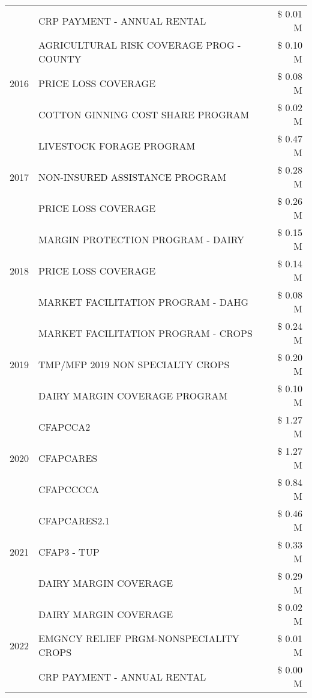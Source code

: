 \begin{tabular}{llr}
 & CRP PAYMENT - ANNUAL RENTAL & \$ 0.01 M \\
\cline{1-3}
\multirow[t]{3}{*}{2016} & AGRICULTURAL RISK COVERAGE PROG - COUNTY & \$ 0.10 M \\
 & PRICE LOSS COVERAGE & \$ 0.08 M \\
 & COTTON GINNING COST SHARE PROGRAM & \$ 0.02 M \\
\cline{1-3}
\multirow[t]{3}{*}{2017} & LIVESTOCK FORAGE PROGRAM & \$ 0.47 M \\
 & NON-INSURED ASSISTANCE PROGRAM & \$ 0.28 M \\
 & PRICE LOSS COVERAGE & \$ 0.26 M \\
\cline{1-3}
\multirow[t]{3}{*}{2018} & MARGIN PROTECTION PROGRAM - DAIRY & \$ 0.15 M \\
 & PRICE LOSS COVERAGE & \$ 0.14 M \\
 & MARKET FACILITATION PROGRAM - DAHG & \$ 0.08 M \\
\cline{1-3}
\multirow[t]{3}{*}{2019} & MARKET FACILITATION PROGRAM - CROPS & \$ 0.24 M \\
 & TMP/MFP 2019 NON SPECIALTY CROPS & \$ 0.20 M \\
 & DAIRY MARGIN COVERAGE PROGRAM & \$ 0.10 M \\
\cline{1-3}
\multirow[t]{3}{*}{2020} & CFAPCCA2 & \$ 1.27 M \\
 & CFAPCARES & \$ 1.27 M \\
 & CFAPCCCCA & \$ 0.84 M \\
\cline{1-3}
\multirow[t]{3}{*}{2021} & CFAPCARES2.1 & \$ 0.46 M \\
 & CFAP3 - TUP & \$ 0.33 M \\
 & DAIRY MARGIN COVERAGE & \$ 0.29 M \\
\cline{1-3}
\multirow[t]{3}{*}{2022} & DAIRY MARGIN COVERAGE & \$ 0.02 M \\
 & EMGNCY RELIEF PRGM-NONSPECIALITY CROPS & \$ 0.01 M \\
 & CRP PAYMENT - ANNUAL RENTAL & \$ 0.00 M \\
\cline{1-3}
\bottomrule
\end{tabular}
